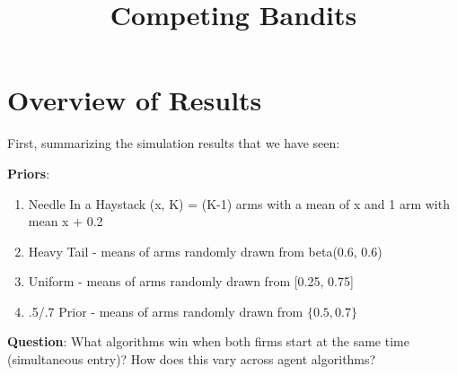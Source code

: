 \documentclass[11pt,letterpaper]{article}
\begin{document}
 

\title{Competing Bandits}
\maketitle

\section*{Overview of Results}

First, summarizing the simulation results that we have seen:

\textbf{Priors}:
\begin{enumerate}
\item Needle In a Haystack (x, K) = (K-1) arms with a mean of x and 1 arm with mean x + 0.2
\item Heavy Tail - means of arms randomly drawn from beta(0.6, 0.6)
\item Uniform - means of arms randomly drawn from [0.25, 0.75]
\item .5/.7 Prior - means of arms randomly drawn from $\{0.5, 0.7\}$
\end{enumerate}

\textbf{Question}: What algorithms win when both firms start at the same time (simultaneous entry)? How does this vary across agent algorithms?
\end{document}
